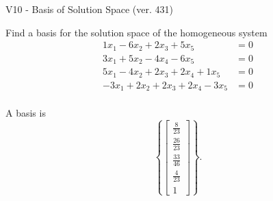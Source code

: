 \begin{exercise}
  \begin{exerciseTitle}V10 - Basis of Solution Space (ver. 431)\end{exerciseTitle}
  \begin{exerciseStatement}
    Find a basis for the solution space of the homogeneous system 
\begin{align*}
 1 x_ 1 -6 x_ 2 + 2 x_ 3 + 5 x_ 5 &= 0  \\ 
  3 x_ 1 + 5 x_ 2 -4 x_ 4 -6 x_ 5 &= 0  \\ 
  5 x_ 1 -4 x_ 2 + 2 x_ 3 + 2 x_ 4 + 1 x_ 5 &= 0  \\ 
  -3 x_ 1 + 2 x_ 2 + 2 x_ 3 + 2 x_ 4 -3 x_ 5 &= 0  \\ 
 \end{align*}


 
  \end{exerciseStatement}

  \begin{exerciseAnswer}
   A basis is   
\[\left\{\left[\begin{array}{c}
\frac{8}{23} \\
\frac{26}{23} \\
\frac{33}{46} \\
\frac{4}{23} \\
1
\end{array}\right]\right\}.\]

  


  \end{exerciseAnswer}
\end{exercise}